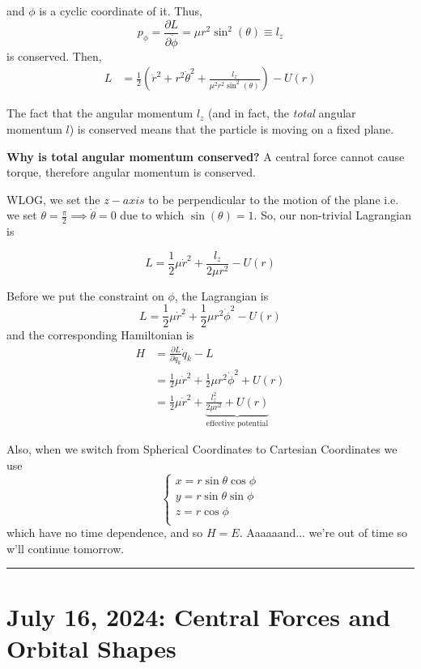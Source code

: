 \documentclass[11pt]{article}
\begin{document}
and $\phi$ is a cyclic coordinate of it. Thus,
\[ p_{\phi} = \frac{\partial L}{\partial \dot{\phi}} = \mu r^2 \sin^2(\theta) \equiv l_z \] is conserved. Then,
\begin{align*}
  L &= \frac{1}{2} \left(\dot{r}^2 + r^2 \dot{\theta}^2 + \frac{l_z}{\mu^2 r^2 \sin^2(\theta)}\right) - U(r)
\end{align*}

\vskip 0.5cm
The fact that the angular momentum $l_z$ (and in fact, the \emph{total} angular momentum $l$) is conserved means that the particle is moving on a fixed plane.

\begin{redbox}
  \textbf{Why is total angular momentum conserved?}
  A central force cannot cause torque, therefore angular momentum is conserved.
\end{redbox}

WLOG, we set the $z-axis$ to be perpendicular to the motion of the plane i.e. we set $\theta = \frac{\pi}{2} \implies \dot{\theta} = 0$ due to which $\sin(\theta) = 1$. So, our non-trivial Lagrangian is 

\[ L = \frac{1}{2}\mu \dot{r}^2 + \frac{l_z}{2\mu r^2} - U(r) \]

Before we put the constraint on $\phi$, the Lagrangian is 
\[ L = \frac{1}{2}\mu \dot{r}^2 + \frac{1}{2} \mu r^2 \dot{\phi}^2 - U(r) \] and the corresponding Hamiltonian is
\begin{align*}
  H &= \frac{\partial L}{\partial \dot{q}_k} \dot{q}_k - L \\
  &= \frac{1}{2}\mu\dot{r}^2 + \frac{1}{2}\mu r^2\dot{\phi}^2 + U(r) \\
  &= \frac{1}{2} \mu \dot{r}^2 + \underbrace{\frac{l_z^2}{2\mu r^2} + U(r)}_{\text{effective potential}}
\end{align*}

Also, when we switch from Spherical Coordinates to Cartesian Coordinates we use 
\[ \begin{cases}
  x = r\sin\theta\cos\phi \\
  y = r\sin\theta\sin\phi \\
  z = r\cos\phi \\
\end{cases} \]
which have no time dependence, and so $H = E$. Aaaaaand... we're out of time so w'll continue tomorrow.
\hrule

\pagebreak
\section{July 16, 2024: Central Forces and Orbital Shapes}
\end{document}
